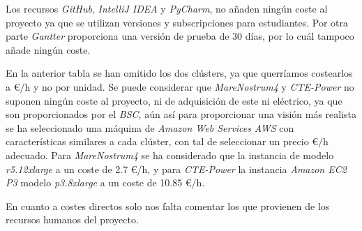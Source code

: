 Los recursos \textit{GitHub}, \textit{IntelliJ IDEA} y \textit{PyCharm}, no añaden ningún coste al proyecto ya que se utilizan versiones y subscripciones para estudiantes. Por otra parte \textit{Gantter} proporciona una versión de prueba de 30 días, por lo cuál tampoco añade ningún coste.
\par\bigskip

En la anterior tabla se han omitido los dos clústers, ya que querríamos costearlos a \euro$/$h y no por unidad. Se puede considerar que \textit{MareNostrum4} y \textit{CTE-Power} no suponen ningún coste al proyecto, ni de adquisición de este ni eléctrico, ya que son proporcionados por el \textit{BSC}, aún así para proporcionar una visión más realista se ha seleccionado una máquina de \textit{Amazon Web Services} \textit{AWS} con características similares a cada clúster, con tal de seleccionar un precio \euro$/$h adecuado. Para \textit{MareNostrum4} se ha considerado que la instancia de modelo \textit{r5.12xlarge} a un coste de 2.7 \euro/h, y para \textit{CTE-Power} la instancia \textit{Amazon EC2 P3} modelo \textit{p3.8xlarge} a un coste de 10.85 \euro/h.
\par\bigskip

En cuanto a costes directos solo nos falta comentar los que provienen de los recursos humanos del proyecto.

\begin{comment}
begin{table}[ht!]
 \centering
 \begin{tabular}{c|c|c|c|} 
  \cline{2-4}
                & Horas (h) & Precio/Hora(\euro) & Total(\euro) \\
  \cline{2-4}\hline
  Desarrollador & 489 & 10 & 4890 \\
  \hline
  Director & 55 & 30 & 1650\\
  \hline 
  Codirector & 50 & 30 & 1500\\
  \hline
  Soporte & 20 & 20 & 400\\
  \hline
  \rowcolor{gray!50}
  Total & - & - & 8440\\
  \hline
 \end{tabular}
\caption{Costes directos provenientes de recursos humanos.}
\end{table}
\end{comment}

